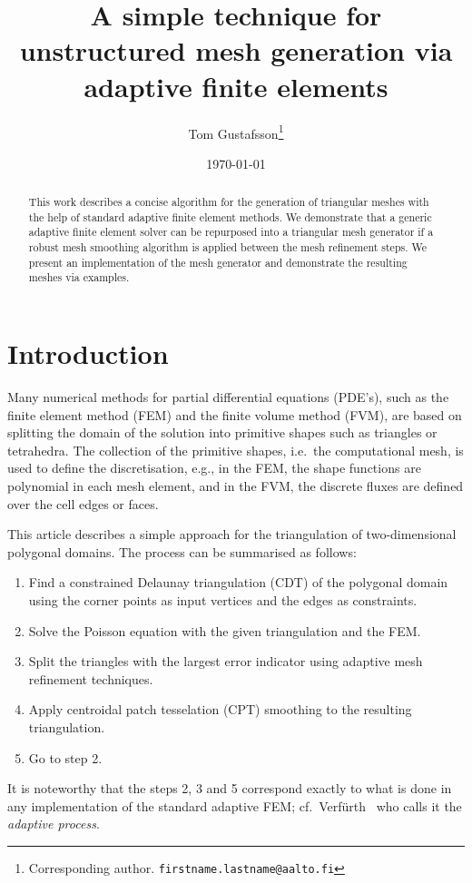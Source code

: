 \documentclass[12pt]{rmstyle}
\author{Tom Gustafsson\footnote{Corresponding author. \texttt{firstname.lastname@aalto.fi}}}
\date{\today}
\title{A simple technique for unstructured mesh generation via adaptive finite elements}
\begin{document}
\newcommand*\DNA{\textsc{dna}}

\newcommand*\Let[2]{\State #1 $\gets$ #2}
\algrenewcommand{}
\algrenewcommand{}

\maketitle

\begin{abstract}
  This work describes a concise algorithm for the generation of triangular
  meshes with the help of standard adaptive finite element methods.  We
  demonstrate that a generic adaptive finite element solver can be repurposed
  into a triangular mesh generator if a robust mesh smoothing algorithm is
  applied between the mesh refinement steps.  We present an implementation of
  the mesh generator and demonstrate the resulting meshes via examples.
\end{abstract}

\section{Introduction}
\label{sec:orge4667b0}

Many numerical methods for partial differential equations (PDE's), such as the
finite element method (FEM) and the finite volume method (FVM), are based on
splitting the domain of the solution into primitive shapes such as triangles or
tetrahedra.  The collection of the primitive shapes, i.e.~the computational
mesh, is used to define the discretisation, e.g., in the FEM, the shape
functions are polynomial in each mesh element, and in the FVM, the discrete
fluxes are defined over the cell edges or faces.

This article describes a simple approach for the triangulation of
two-dimensional polygonal domains.  The process can be summarised as follows:
\begin{enumerate}
\item Find a constrained Delaunay triangulation (CDT) of the polygonal domain
      using the corner points as input vertices and the edges
      as constraints.
\item Solve the Poisson equation with the given triangulation
      and the FEM.
\item Split
      the triangles with the largest error indicator
      using adaptive mesh refinement techniques.
\item Apply centroidal patch tesselation (CPT) smoothing to the resulting
  triangulation.
\item Go to step 2.
\end{enumerate}
It is noteworthy that the steps 2, 3 and 5 correspond exactly to what is done in
any implementation of the standard adaptive FEM;
cf.~Verf\"{u}rth~\cite{Verf_rth_2013} who calls it the \emph{adaptive process}.
\end{document}
